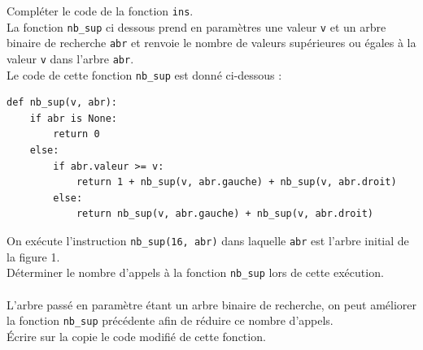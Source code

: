 \documentclass[a4paper,12pt,article,firamath]{nsi}
\begin{document}
\question Compléter le code de la fonction \texttt{ins}.\\



La fonction \texttt{nb_sup} ci dessous prend en paramètres une valeur \texttt{v} et un arbre binaire de recherche \texttt{abr} et renvoie le nombre de valeurs supérieures ou égales à la valeur \texttt{v} dans l'arbre \texttt{abr}.\\
Le code de cette fonction \texttt{nb_sup} est donné ci-dessous :

\begin{verbatim}
def nb_sup(v, abr):
    if abr is None:
        return 0
    else:
        if abr.valeur >= v:
            return 1 + nb_sup(v, abr.gauche) + nb_sup(v, abr.droit)
        else:
            return nb_sup(v, abr.gauche) + nb_sup(v, abr.droit)
\end{verbatim}

On exécute l'instruction \texttt{nb_sup(16, abr)} dans laquelle \texttt{abr} est l'arbre initial de la figure 1.\\

\question Déterminer le nombre d'appels à la fonction \texttt{nb_sup} lors de cette exécution.\\

\\

L'arbre passé en paramètre étant un arbre binaire de recherche, on peut
améliorer la fonction \texttt{nb_sup} précédente afin de réduire ce nombre d'appels.\\

\question Écrire sur la copie le code modifié de cette fonction.\\

\end{document}
